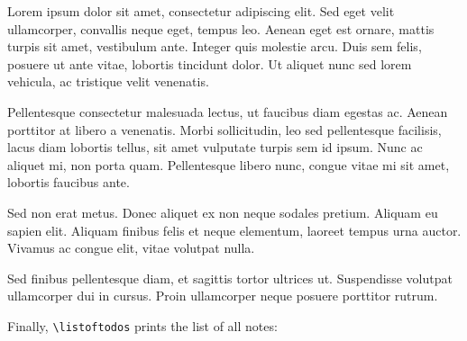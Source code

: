 Lorem ipsum dolor sit amet, consectetur adipiscing elit. Sed eget velit ullamcorper, convallis neque eget, tempus leo. Aenean eget est ornare, mattis turpis sit amet, vestibulum ante. Integer quis molestie arcu. Duis sem felis, posuere ut ante vitae, lobortis tincidunt dolor. Ut aliquet nunc sed lorem vehicula, ac tristique velit venenatis.

Pellentesque consectetur malesuada lectus, ut faucibus diam egestas ac. Aenean porttitor at libero a venenatis. Morbi sollicitudin, leo sed pellentesque facilisis, lacus diam lobortis tellus, sit amet vulputate turpis sem id ipsum. Nunc ac aliquet mi, non porta quam. Pellentesque libero nunc, congue vitae mi sit amet, lobortis faucibus ante.

Sed non erat metus. Donec aliquet ex non neque sodales pretium. Aliquam eu sapien elit. Aliquam finibus felis et neque elementum, laoreet tempus urna auctor. Vivamus ac congue elit, vitae volutpat nulla.

Sed finibus pellentesque diam, et sagittis tortor ultrices ut. Suspendisse volutpat ullamcorper dui in cursus. Proin ullamcorper neque posuere porttitor rutrum.

Finally, \verb|\listoftodos| prints the list of all notes:
